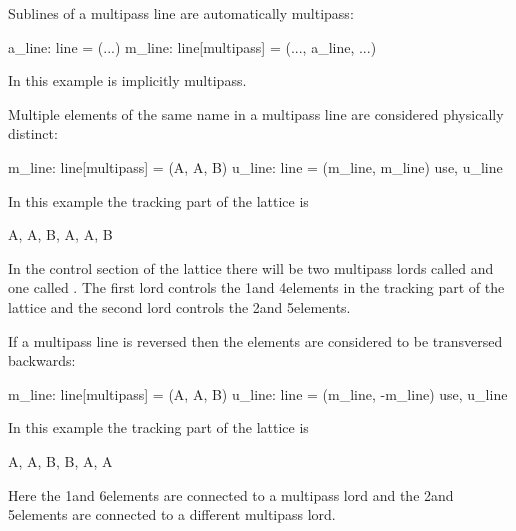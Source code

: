 Sublines of a multipass line are automatically multipass:
\begin{example}
  a_line: line = (...)
  m_line: line[multipass] = (..., a_line, ...)
\end{example}
In this example  is implicitly multipass.

Multiple elements of the same name in a multipass line are considered 
physically distinct:
\begin{example}
  m_line: line[multipass] = (A, A, B)
  u_line: line = (m_line, m_line)
  use, u_line
\end{example}
In this example the tracking part of the lattice is
\begin{example}
  A, A, B, A, A, B
\end{example}
In the control section of the lattice there will be two multipass
lords called  and one called . The first  lord 
controls the 1\St and 4\Th elements in the tracking part of the lattice 
and the second  lord controls the 2\Nd and 5\Th elements.

If a multipass line is reversed then the elements are considered to be
transversed backwards:
\begin{example}
  m_line: line[multipass] = (A, A, B)
  u_line: line = (m_line, -m_line)
  use, u_line
\end{example}
In this example the tracking part of the lattice is
\begin{example}
  A, A, B, B, A, A
\end{example}
Here the 1\St and 6\Th elements are connected to a multipass lord and the
2\Nd and 5\Th elements are connected to a different multipass lord.